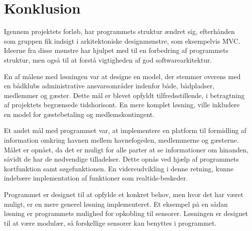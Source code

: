 \chapter{Konklusion}
\label{cha:konklusion}

Igennem projektets forløb, har programmets struktur ændret sig, efterhånden som gruppen fik indsigt i arkitektoniske designmønstre, som eksempelvis MVC. Ideerne fra disse mønstre har hjulpet med til en forbedring af programmets struktur, men også til at forstå vigtigheden af god softwarearkitektur.

En af målene med løsningen var at designe en model, der stemmer overens med en bådklubs administrative ansvarsområder indenfor både, bådpladser, medlemmer og gæster. Dette mål er blevet opfyldt tilfredsstillende, i betragtning af projektets begrænsede tidshorisont. En mere komplet løsning, ville inkludere en model for gæstebetaling og medlemskontingent.

Et andet mål med programmet var, at implementere en platform til formidling af information omkring havnen mellem havnefogeden, medlemmerne og gæsterne. Målet er opnået, da det er muligt for alle parter at se informationer om hinanden, såvidt de har de nødvendige tilladelser. Dette opnås ved hjælp af programmets kortfunktion samt søgefunktionen. En videreudvikling i denne retning, kunne indebære implementation af funktioner som realtids-beskeder.

Programmet er designet til at opfylde et konkret behov, men hvor det har været muligt, er en mere generel løsning implementeret. Et eksempel på en sådan løsning er programmets mulighed for opkobling til sensorer. Løsningen er designet til at være modulær, så forskellige sensorer kan benyttes i programmet.
